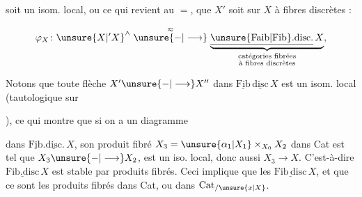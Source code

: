 
soit un isom. local, ou ce qui revient au $=$, que  $X'$ soit \uline{} sur $X$ à fibres discrètes :

\[
\varphi_X\colon \unsure{X|{}'X}^\wedge
\overset{\approx}{\mathrel{\unsure{-|\longrightarrow}}}
\underbrace{\underline{\unsure{\mathrm{Faib}|\mathrm{Fib}}\mathrm{.disc.}}\,X}_{\substack{\text{catégories fibrées}\\\text{à fibres discrètes}}} ,
\]

Notons que toute flèche $X'\unsure{-|\longrightarrow}X''$ dans $\underline{\mathrm{Fib}}\,\underline{\mathrm{disc}}\,X$  est un isom. local (tautologique sur


), ce qui montre que si on a un diagramme


dans $\underline{\mathrm{Fib}}.\underline{\mathrm{disc}}.\,X$, son produit fibré $X_3=\unsure{\alpha_1|X_1}\times_{X_0}X_2$ dans Cat est tel que $X_3\unsure{-|\longrightarrow}X_2$, est un iso. local, donc aussi $X_3\longrightarrow X$. C'est-à-dire $\underline{\mathrm{Fib.disc}}\,X$ est stable par produits fibrés. Ceci implique que les   $\underline{\mathrm{Fib\,disc}}\,X$, et que ce sont les produits fibrés dans Cat, ou dans $\mathrm{Cat}_{/\unsure{x|X}}$.

